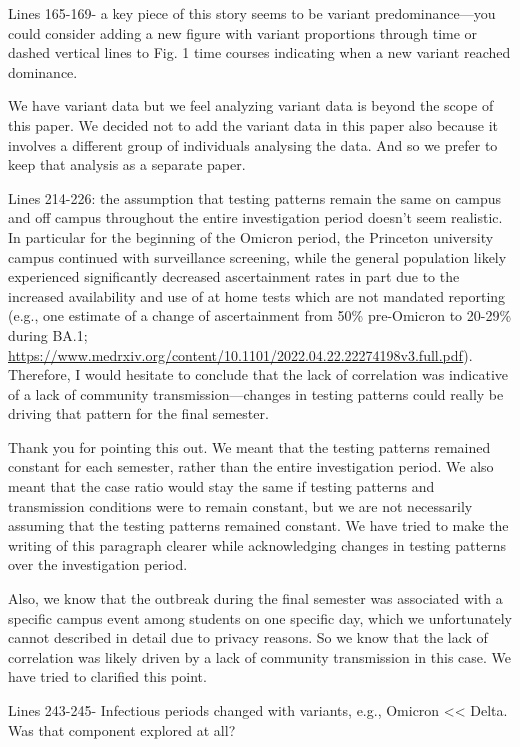 \documentclass[12pt]{article}
\newcommand{\revtext}{\textsf}
\begin{document}
\revtext{Lines 165-169- a key piece of this story seems to be variant predominance—you could consider adding a new figure with variant proportions through time or dashed vertical lines to Fig. 1 time courses indicating when a new variant reached dominance.}

We have variant data but we feel analyzing variant data is beyond the scope of this paper.
We decided not to add the variant data in this paper also because it involves a different group of individuals analysing the data.
And so we prefer to keep that analysis as a separate paper.

\revtext{Lines 214-226: the assumption that testing patterns remain the same on campus and off campus throughout the entire investigation period doesn’t seem realistic. In particular for the beginning of the Omicron period, the Princeton university campus continued with surveillance screening, while the general population likely experienced significantly decreased ascertainment rates in part due to the increased availability and use of at home tests which are not mandated reporting (e.g., one estimate of a change of ascertainment from 50\% pre-Omicron to 20-29\% during BA.1; \url{https://www.medrxiv.org/content/10.1101/2022.04.22.22274198v3.full.pdf}). Therefore, I would hesitate to conclude that the lack of correlation was indicative of a lack of community transmission—changes in testing patterns could really be driving that pattern for the final semester.}

Thank you for pointing this out. 
We meant that the testing patterns remained constant for each semester, rather than the entire investigation period.
We also meant that the case ratio would stay the same if testing patterns and transmission conditions were to remain constant, but we are not necessarily assuming that the testing patterns remained constant.
We have tried to make the writing of this paragraph clearer while acknowledging changes in testing patterns over the investigation period.

Also, we know that the outbreak during the final semester was associated with a specific campus event among students on one specific day, which we unfortunately cannot described in detail due to privacy reasons. 
So we know that the lack of correlation was likely driven by a lack of community transmission in this case. 
We have tried to clarified this point.

\revtext{Lines 243-245- Infectious periods changed with variants, e.g., Omicron << Delta. Was that component explored at all?} 
\end{document}

